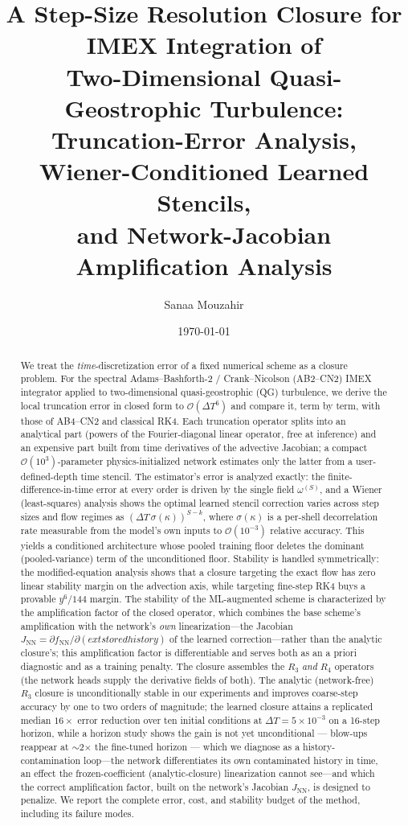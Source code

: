 \documentclass[11pt]{article}
\title{\bfseries A Step-Size Resolution Closure for IMEX Integration of\\
Two-Dimensional Quasi-Geostrophic Turbulence:\\
\large Truncation-Error Analysis, Wiener-Conditioned Learned Stencils,\\
and Network-Jacobian Amplification Analysis}
\author[1]{Sanaa Mouzahir}
\author[1]{\TODO{co-authors / advisor}}
\affil[1]{\small Department of Mechanical Engineering and Center for
Computational Science and Engineering,\\ Massachusetts Institute of Technology,
Cambridge, MA 02139}
\date{\today}
\theoremstyle{plain}
\theoremstyle{definition}
\newcommand{\bO}{\mathcal{O}}
\newcommand{\DT}{\Delta T}
\begin{document}
\maketitle

\begin{abstract}
\noindent
We treat the \emph{time}-discretization error of a fixed numerical scheme as a
closure problem. For the spectral Adams--Bashforth-2 / Crank--Nicolson
(AB2--CN2) IMEX integrator applied to two-dimensional quasi-geostrophic (QG)
turbulence, we derive the local truncation error in closed form to
$\bO(\DT^6)$ and compare it, term by term, with those of AB4--CN2 and
classical RK4. Each truncation operator splits into an analytical part (powers
of the Fourier-diagonal linear operator, free at inference) and an expensive
part built from time derivatives of the advective Jacobian; a compact
$\bO(10^3)$-parameter physics-initialized network estimates only the
latter from a user-defined-depth time stencil. The estimator's error is analyzed
exactly: the finite-difference-in-time error at every order is driven by the
single field $\omega^{(S)}$, and a Wiener (least-squares) analysis shows the
optimal learned stencil correction varies across step sizes and flow regimes as
$(\DT\,\sigma(\kappa))^{S-k}$, where $\sigma(\kappa)$ is a per-shell
decorrelation rate measurable from the model's own inputs to
$\bO(10^{-3})$ relative accuracy. This yields a conditioned architecture whose
pooled training floor deletes the dominant (pooled-variance) term of the
unconditioned floor. Stability is handled symmetrically: the modified-equation
analysis shows that a closure targeting the exact flow has zero linear
stability margin on the advection axis, while targeting fine-step RK4 buys a
provable $y^6/144$ margin. The stability of the ML-augmented scheme is
characterized by the amplification factor of the closed operator, which
combines the base scheme's amplification with the network's \emph{own}
linearization---the Jacobian $J_{\mathrm{NN}}=\partial f_{\mathrm{NN}}/
\partial(	ext{stored history})$ of the learned correction---rather than
the analytic closure's; this amplification factor is differentiable and
serves both as an a priori diagnostic and as a training penalty. The closure assembles the
$R_3$ \emph{and} $R_4$ operators (the network heads supply the derivative
fields of both). The analytic (network-free) $R_3$
closure is unconditionally stable in our experiments and improves coarse-step
accuracy by one to two orders of magnitude; the learned closure attains a
replicated median
$16\times$ error reduction over ten initial conditions at $\DT=5\times10^{-3}$
on a 16-step horizon, while a horizon study shows the gain is not yet
unconditional --- blow-ups reappear at $\sim$2$\times$ the fine-tuned horizon
--- which we diagnose as a history-contamination loop---the network
differentiates its own contaminated history in time, an effect the
frozen-coefficient (analytic-closure) linearization cannot see---and which
the correct amplification factor, built on the network's Jacobian
$J_{\mathrm{NN}}$, is designed to penalize. We report the complete error, cost, and
stability budget of the method, including its failure modes.


\end{abstract}
\end{document}

